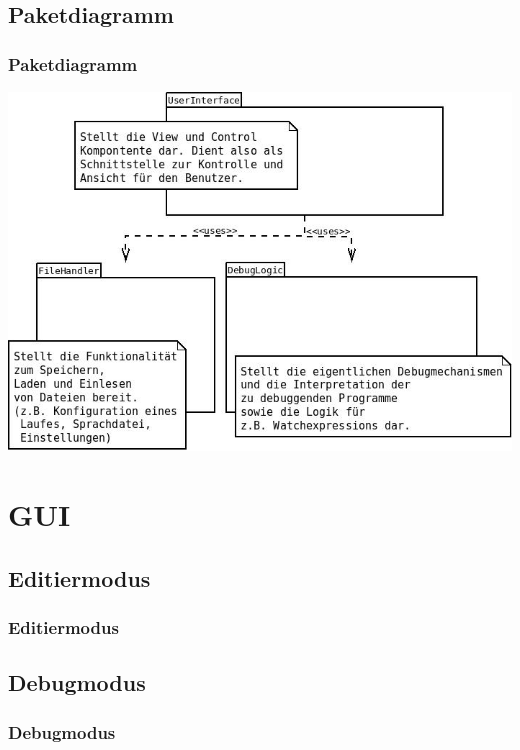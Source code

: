 \documentclass{beamer}
\begin{document}
\subsection{Paketdiagramm}
\begin{frame}
\frametitle{Paketdiagramm}
\includegraphics[scale=0.3]{../pakete}
\end{frame}

\section{GUI}
\subsection{Editiermodus}
\begin{frame}
\frametitle{Editiermodus}
\end{frame}

\subsection{Debugmodus}
\begin{frame}
\frametitle{Debugmodus}
\end{frame}




\end{document}
